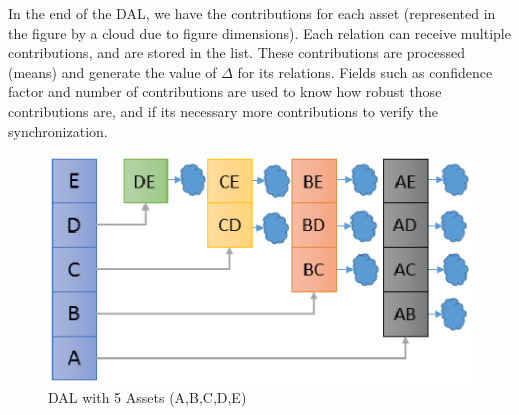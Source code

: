 In the end of the DAL, we have the contributions for each asset (represented in the figure by a cloud due to figure dimensions). Each relation can receive multiple contributions, and are stored in the list. These contributions are processed (means) and generate the value of $\Delta$ for its relations. Fields such as confidence factor and number of contributions are used to know how robust those contributions are, and if its necessary more contributions to verify the synchronization.

\begin{figure}
	\centering
	\includegraphics[scale=0.8]{figures/dal}
	\caption{DAL with 5 Assets (A,B,C,D,E)}
	\label{dal}
\end{figure}
